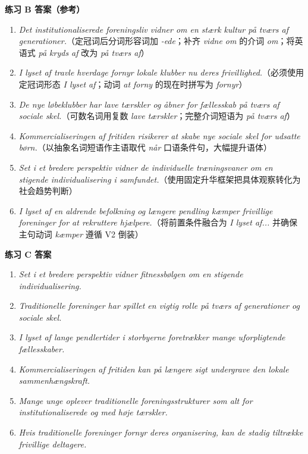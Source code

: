 \begin{answerbox}
\textbf{练习 B 答案（参考）}
\begin{enumerate}
  \item \textit{Det institutionaliserede foreningsliv vidner om en stærk kultur på tværs af generationer.}（定冠词后分词形容词加 \textit{-ede}；补齐 \textit{vidne om} 的介词 \textit{om}；将英语式 \textit{på kryds af} 改为 \textit{på tværs af}）
  \item \textit{I lyset af travle hverdage fornyr lokale klubber nu deres frivillighed.}（必须使用定冠词形态 \textit{I lyset af}；动词 \textit{at forny} 的现在时拼写为 \textit{fornyr}）
  \item \textit{De nye løbeklubber har lave tærskler og åbner for fællesskab på tværs af sociale skel.}（可数名词用复数 \textit{lave tærskler}；完整介词短语为 \textit{på tværs af}）
  \item \textit{Kommercialiseringen af fritiden risikerer at skabe nye sociale skel for udsatte børn.}（以抽象名词短语作主语取代 \textit{når} 口语条件句，大幅提升语体）
  \item \textit{Set i et bredere perspektiv vidner de individuelle træningsvaner om en stigende individualisering i samfundet.}（使用固定升华框架把具体观察转化为社会趋势判断）
  \item \textit{I lyset af en aldrende befolkning og længere pendling kæmper frivillige foreninger for at rekruttere hjælpere.}（将前置条件融合为 \textit{I lyset af...} 并确保主句动词 \textit{kæmper} 遵循 V2 倒装）
\end{enumerate}

\textbf{练习 C 答案}
\begin{enumerate}
  \item \textit{Set i et bredere perspektiv vidner fitnessbølgen om en stigende individualisering.}
  \item \textit{Traditionelle foreninger har spillet en vigtig rolle på tværs af generationer og sociale skel.}
  \item \textit{I lyset af lange pendlertider i storbyerne foretrækker mange uforpligtende fællesskaber.}
  \item \textit{Kommercialiseringen af fritiden kan på længere sigt undergrave den lokale sammenhængskraft.}
  \item \textit{Mange unge oplever traditionelle foreningsstrukturer som alt for institutionaliserede og med høje tærskler.}
  \item \textit{Hvis traditionelle foreninger fornyr deres organisering, kan de stadig tiltrække frivillige deltagere.}
\end{enumerate}


\end{answerbox}
